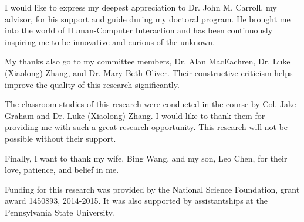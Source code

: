 
I would like to express my deepest appreciation to  Dr. John M. Carroll, my advisor, for his support and guide during my doctoral program. He brought me into the world of Human-Computer Interaction and has been continuously inspiring me to be innovative and curious of the unknown.

My thanks also go to my committee members, Dr. Alan MacEachren, Dr. Luke (Xiaolong) Zhang, and Dr. Mary Beth Oliver. Their constructive criticism helps improve the quality of this research significantly.

The classroom studies of this research were conducted in the course by Col. Jake Graham and Dr. Luke (Xiaolong) Zhang. I would like to thank them for providing me with such a great research opportunity. This research will not be possible without their support. 

Finally, I want to thank my wife, Bing Wang, and my son, Leo Chen, for their love, patience, and belief in me. 

Funding for this research was provided by the National Science Foundation, grant award 1450893, 2014-2015. It was also supported by assistantships at the Pennsylvania State University.
